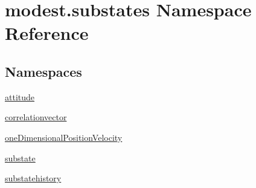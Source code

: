 \hypertarget{namespacemodest_1_1substates}{}\section{modest.\+substates Namespace Reference}
\label{namespacemodest_1_1substates}
\subsection*{Namespaces}
\begin{DoxyCompactItemize}
\item 
 \hyperlink{namespacemodest_1_1substates_1_1attitude}{attitude}
\item 
 \hyperlink{namespacemodest_1_1substates_1_1correlationvector}{correlationvector}
\item 
 \hyperlink{namespacemodest_1_1substates_1_1oneDimensionalPositionVelocity}{one\+Dimensional\+Position\+Velocity}
\item 
 \hyperlink{namespacemodest_1_1substates_1_1substate}{substate}
\item 
 \hyperlink{namespacemodest_1_1substates_1_1substatehistory}{substatehistory}
\end{DoxyCompactItemize}
